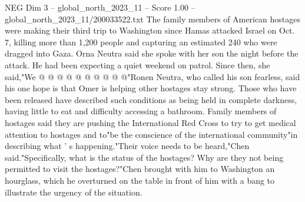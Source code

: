 \begin{textsample}{NEG Dim 3 – global\_north\_2023\_11 – Score 1.00 – global\_north\_2023\_11/200033522.txt}
The family members of American hostages were making their third trip to Washington since Hamas attacked Israel on Oct. 7, killing more than 1,200 people and capturing an estimated 240 who were dragged into Gaza.
Orna Neutra said she spoke with her son the night before the attack.
He had been expecting a quiet weekend on patrol.
Since then, she said,"We @ @ @ @ @ @ @ @ @ @"Ronen Neutra, who called his son fearless, said his one hope is that Omer is helping other hostages stay strong.
Those who have been released have described such conditions as being held in complete darkness, having little to eat and difficulty accessing a bathroom.
Family members of hostages said they are pushing the International Red Cross to try to get medical attention to hostages and to"be the conscience of the international community"in describing what ' s happening."Their voice needs to be heard,"Chen said."Specifically, what is the status of the hostages?
Why are they not being permitted to visit the hostages?"Chen brought with him to Washington an hourglass, which he overturned on the table in front of him with a bang to illustrate the urgency of the situation.

\end{textsample}
